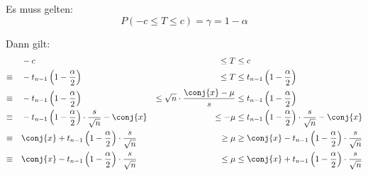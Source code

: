 \documentclass{abgabe}
\begin{document}
\begin{questions}
\begin{parts}
\begin{solution}
            Es muss gelten:
            \[
                P(-c \leq T \leq c) = \gamma = 1 - \alpha
            \]

            Dann gilt:
            \begin{alignat*}{3}
                             & -c                                                                             & \leq T                                       & \leq c                                                                              \\
                \equiv \quad & -t_{n-1} \left( 1-\frac{\alpha}{2} \right)                                     & \leq T                                       & \leq t_{n-1} \left( 1-\frac{\alpha}{2} \right)                                      \\
                \equiv \quad & -t_{n-1} \left( 1-\frac{\alpha}{2} \right)                                     & \leq \sqrt{n} \cdot \frac{\conj{x} - \mu}{s} & \leq t_{n-1} \left( 1-\frac{\alpha}{2} \right)                                      \\
                \equiv \quad & -t_{n-1} \left( 1-\frac{\alpha}{2} \right) \cdot \frac{s}{\sqrt{n}} - \conj{x} & \leq  - \mu                                  & \leq t_{n-1} \left( 1-\frac{\alpha}{2} \right) \cdot \frac{s}{\sqrt{n}}  - \conj{x} \\
                \equiv \quad & \conj{x} + t_{n-1} \left( 1-\frac{\alpha}{2} \right) \cdot \frac{s}{\sqrt{n}}  & \geq  \mu                                    & \geq \conj{x} - t_{n-1} \left( 1-\frac{\alpha}{2} \right) \cdot \frac{s}{\sqrt{n}}  \\
                \equiv \quad & \conj{x} - t_{n-1} \left( 1-\frac{\alpha}{2} \right) \cdot \frac{s}{\sqrt{n}}  & \leq  \mu                                    & \leq \conj{x} + t_{n-1} \left( 1-\frac{\alpha}{2} \right) \cdot \frac{s}{\sqrt{n}}
            \end{alignat*}


\end{solution}
\end{parts}
\end{questions}
\end{document}
